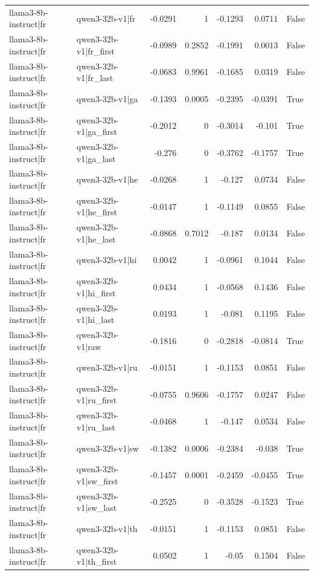 \begin{table}
\begin{tabular}{l l r r r r l}
llama3-8b-instruct|fr & qwen3-32b-v1|fr & -0.0291 & 1 & -0.1293 & 0.0711 & False \\
llama3-8b-instruct|fr & qwen3-32b-v1|fr_first & -0.0989 & 0.2852 & -0.1991 & 0.0013 & False \\
llama3-8b-instruct|fr & qwen3-32b-v1|fr_last & -0.0683 & 0.9961 & -0.1685 & 0.0319 & False \\
llama3-8b-instruct|fr & qwen3-32b-v1|ga & -0.1393 & 0.0005 & -0.2395 & -0.0391 & True \\
llama3-8b-instruct|fr & qwen3-32b-v1|ga_first & -0.2012 & 0 & -0.3014 & -0.101 & True \\
llama3-8b-instruct|fr & qwen3-32b-v1|ga_last & -0.276 & 0 & -0.3762 & -0.1757 & True \\
llama3-8b-instruct|fr & qwen3-32b-v1|he & -0.0268 & 1 & -0.127 & 0.0734 & False \\
llama3-8b-instruct|fr & qwen3-32b-v1|he_first & -0.0147 & 1 & -0.1149 & 0.0855 & False \\
llama3-8b-instruct|fr & qwen3-32b-v1|he_last & -0.0868 & 0.7012 & -0.187 & 0.0134 & False \\
llama3-8b-instruct|fr & qwen3-32b-v1|hi & 0.0042 & 1 & -0.0961 & 0.1044 & False \\
llama3-8b-instruct|fr & qwen3-32b-v1|hi_first & 0.0434 & 1 & -0.0568 & 0.1436 & False \\
llama3-8b-instruct|fr & qwen3-32b-v1|hi_last & 0.0193 & 1 & -0.081 & 0.1195 & False \\
llama3-8b-instruct|fr & qwen3-32b-v1|raw & -0.1816 & 0 & -0.2818 & -0.0814 & True \\
llama3-8b-instruct|fr & qwen3-32b-v1|ru & -0.0151 & 1 & -0.1153 & 0.0851 & False \\
llama3-8b-instruct|fr & qwen3-32b-v1|ru_first & -0.0755 & 0.9606 & -0.1757 & 0.0247 & False \\
llama3-8b-instruct|fr & qwen3-32b-v1|ru_last & -0.0468 & 1 & -0.147 & 0.0534 & False \\
llama3-8b-instruct|fr & qwen3-32b-v1|sw & -0.1382 & 0.0006 & -0.2384 & -0.038 & True \\
llama3-8b-instruct|fr & qwen3-32b-v1|sw_first & -0.1457 & 0.0001 & -0.2459 & -0.0455 & True \\
llama3-8b-instruct|fr & qwen3-32b-v1|sw_last & -0.2525 & 0 & -0.3528 & -0.1523 & True \\
llama3-8b-instruct|fr & qwen3-32b-v1|th & -0.0151 & 1 & -0.1153 & 0.0851 & False \\
llama3-8b-instruct|fr & qwen3-32b-v1|th_first & 0.0502 & 1 & -0.05 & 0.1504 & False \\

\end{tabular}
\end{table}
